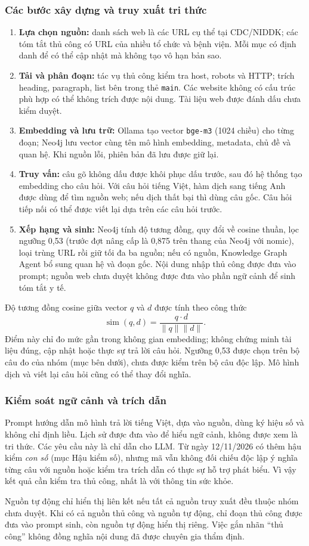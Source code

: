 \subsubsection{Các bước xây dựng và truy xuất tri thức}
\begin{enumerate}
\item \textbf{Lựa chọn nguồn:} danh sách web là các URL cụ thể tại CDC/NIDDK; các tóm tắt thủ công có URL của nhiều tổ chức và bệnh viện. Mỗi mục có định danh để có thể cập nhật mà không tạo vô hạn bản sao.
\item \textbf{Tải và phân đoạn:} tác vụ thủ công kiểm tra host, robots và HTTP; trích heading, paragraph, list bên trong thẻ \texttt{main}. Các website không có cấu trúc phù hợp có thể không trích được nội dung. Tài liệu web được đánh dấu chưa kiểm duyệt.
\item \textbf{Embedding và lưu trữ:} Ollama tạo vector \texttt{bge-m3} (1024 chiều) cho từng đoạn; Neo4j lưu vector cùng tên mô hình embedding, metadata, chủ đề và quan hệ. Khi nguồn lỗi, phiên bản đã lưu được giữ lại.
\item \textbf{Truy vấn:} câu gõ không dấu được khôi phục dấu trước, sau đó hệ thống tạo embedding cho câu hỏi. Với câu hỏi tiếng Việt, hàm dịch sang tiếng Anh được dùng để tìm nguồn web; nếu dịch thất bại thì dùng câu gốc. Câu hỏi tiếp nối có thể được viết lại dựa trên các câu hỏi trước.
\item \textbf{Xếp hạng và sinh:} Neo4j tính độ tương đồng, quy đổi về cosine thuần, lọc ngưỡng 0,53 (trước đợt nâng cấp là 0,875 trên thang của Neo4j với nomic), loại trùng URL rồi giữ tối đa ba nguồn; nếu có nguồn, Knowledge Graph Agent bổ sung quan hệ và đoạn gốc. Nội dung nhập thủ công được đưa vào prompt; nguồn web chưa duyệt không được đưa vào phần ngữ cảnh để sinh tóm tắt y tế.
\end{enumerate}
\noindent Độ tương đồng cosine giữa vector $q$ và $d$ được tính theo công thức
\[
\operatorname{sim}(q,d)=\frac{q\cdot d}{\lVert q\rVert\lVert d\rVert}.
\]
Điểm này chỉ đo mức gần trong không gian embedding; không chứng minh tài liệu đúng, cập nhật hoặc thực sự trả lời câu hỏi. Ngưỡng 0,53 được chọn trên bộ câu đo của nhóm (mục bên dưới), chưa được kiểm trên bộ câu độc lập. Mô hình dịch và viết lại câu hỏi cũng có thể thay đổi nghĩa.
\subsubsection{Kiểm soát ngữ cảnh và trích dẫn}
Prompt hướng dẫn mô hình trả lời tiếng Việt, dựa vào nguồn, dùng ký hiệu số và không chỉ định liều. Lịch sử được đưa vào để hiểu ngữ cảnh, không được xem là tri thức. Các yêu cầu này là chỉ dẫn cho LLM. Từ ngày 12/11/2026 có thêm hậu kiểm \emph{con số} (mục Hậu kiểm số), nhưng mã vẫn không đối chiếu độc lập ý nghĩa từng câu với nguồn hoặc kiểm tra trích dẫn có thực sự hỗ trợ phát biểu. Vì vậy kết quả cần kiểm tra thủ công, nhất là với thông tin sức khỏe.

Nguồn tự động chỉ hiển thị liên kết nếu tất cả nguồn truy xuất đều thuộc nhóm chưa duyệt. Khi có cả nguồn thủ công và nguồn tự động, chỉ đoạn thủ công được đưa vào prompt sinh, còn nguồn tự động hiển thị riêng. Việc gắn nhãn “thủ công” không đồng nghĩa nội dung đã được chuyên gia thẩm định.

